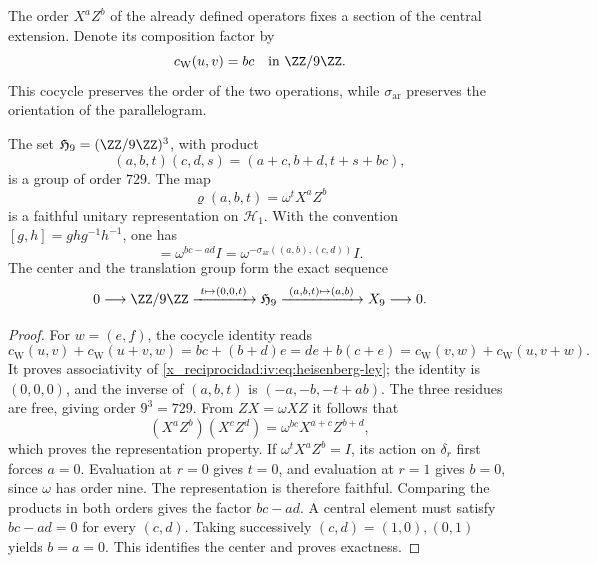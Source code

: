 The order \(X^aZ^b\) of the already defined operators fixes a section
of the central extension. Denote its composition factor by
\begin{equation}
 c_{\mathrm W}(u,v)=bc\quad\text{in }\ZZ/9\ZZ.
 \label{x_reciprocidad:iv:eq:weyl-cociclo-polarizado}
\end{equation}
This cocycle preserves the order of the two operations, while
\(\sigma_{\mathrm{ar}}\) preserves the orientation of the parallelogram.

\begin{proposition}
\label{x_reciprocidad:iv:prop:heisenberg-orientado}
The set \(\mathfrak H_9=(\ZZ/9\ZZ)^3\), with product
\begin{equation}
 (a,b,t)(c,d,s)=(a+c,b+d,t+s+bc),
 \label{x_reciprocidad:iv:eq:heisenberg-ley}
\end{equation}
is a group of order \(729\). The map
\[
 \varrho(a,b,t)=\omega^tX^aZ^b
\]
is a faithful unitary representation on \(\mathcal H_1\).
With the convention \([g,h]=ghg^{-1}h^{-1}\), one has
\begin{equation}
 [\varrho(a,b,0),\varrho(c,d,0)]
 =\omega^{bc-ad}I
 =\omega^{-\sigma_{\mathrm{ar}}((a,b),(c,d))}I.
 \label{x_reciprocidad:iv:eq:weyl-conmutador-orientado}
\end{equation}
The center and the translation group form the exact sequence
\[
 0\longrightarrow\ZZ/9\ZZ
 \xrightarrow{\ t\mapsto(0,0,t)\ }\mathfrak H_9
 \xrightarrow{\ (a,b,t)\mapsto(a,b)\ }X_9
 \longrightarrow0.
\]
\end{proposition}
\begin{proof}
For \(w=(e,f)\), the cocycle identity reads
\[
 c_{\mathrm W}(u,v)+c_{\mathrm W}(u+v,w)
 =bc+(b+d)e
 =de+b(c+e)
 =c_{\mathrm W}(v,w)+c_{\mathrm W}(u,v+w).
\]
It proves associativity of \eqref{x_reciprocidad:iv:eq:heisenberg-ley}; the identity
is \((0,0,0)\), and the inverse of \((a,b,t)\) is
\((-a,-b,-t+ab)\). The three residues are free, giving order
\(9^3=729\). From \(ZX=\omega XZ\) it follows that
\[
 (X^aZ^b)(X^cZ^d)=\omega^{bc}X^{a+c}Z^{b+d},
\]
which proves the representation property. If
\(\omega^tX^aZ^b=I\), its action on \(\delta_r\) first forces
\(a=0\). Evaluation at \(r=0\) gives \(t=0\), and
evaluation at \(r=1\) gives \(b=0\), since \(\omega\) has order
nine. The representation is therefore faithful. Comparing the
products in both orders gives the factor \(bc-ad\).
A central element must satisfy \(bc-ad=0\) for every \((c,d)\).
Taking successively \((c,d)=(1,0),(0,1)\) yields
\(b=a=0\). This identifies the center and proves exactness.
\end{proof}

